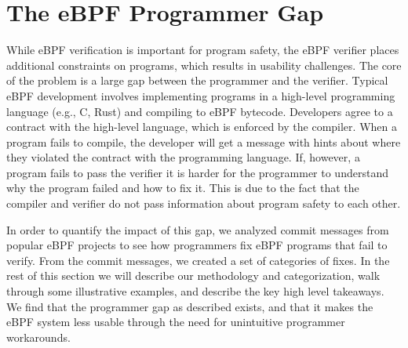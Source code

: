 \section{The eBPF Programmer Gap}
\label{sec:motivation}

While eBPF verification is important for program safety, the eBPF verifier
    places additional constraints on programs, which results in usability challenges.
The core of the problem is a large gap between the programmer and the
    verifier.
Typical eBPF development involves implementing programs in a high-level
    programming language (e.g., C, Rust) and compiling to eBPF bytecode.
Developers agree to a contract with the high-level language, which is
    enforced by the compiler.
When a program fails to compile, the developer will get a message with
    hints about where they violated
    the contract with the programming language.
If, however, a program fails to pass the verifier it is harder for the programmer
    to understand why the program failed and how to fix it.
This is due to the fact that the compiler and verifier do not pass information
    about program safety to each other.

In order to quantify the impact of this gap,
    we analyzed commit messages from popular eBPF projects to see how programmers fix
    eBPF programs that fail to verify.
From the commit messages, we created a set of categories of fixes.
In the rest of this section we will describe our methodology and categorization, walk through some illustrative examples, and describe the key high level takeaways.
We find that the programmer gap as described exists, and that it makes the eBPF system less usable through the need for unintuitive programmer workarounds.




